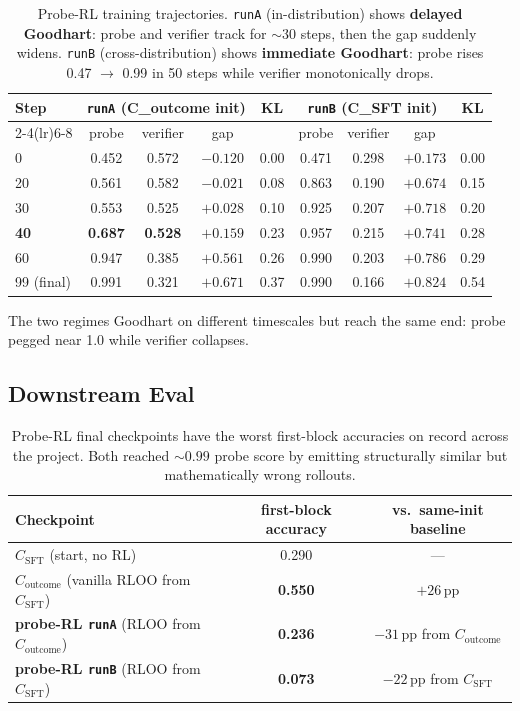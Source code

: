 \documentclass[11pt]{article}
\begin{document}
\begin{table}[h]
\centering
\small
\begin{tabular}{lcccccccc}
\toprule
Step & \multicolumn{3}{c}{\texttt{runA} (C\_outcome init)} & KL & \multicolumn{3}{c}{\texttt{runB} (C\_SFT init)} & KL \\
\cmidrule(lr){2-4}\cmidrule(lr){6-8}
& probe & verifier & gap & & probe & verifier & gap & \\
\midrule
0   & 0.452 & 0.572 & $-0.120$ & 0.00 & 0.471 & 0.298 & $+0.173$ & 0.00 \\
20  & 0.561 & 0.582 & $-0.021$ & 0.08 & 0.863 & 0.190 & $+0.674$ & 0.15 \\
30  & 0.553 & 0.525 & $+0.028$ & 0.10 & 0.925 & 0.207 & $+0.718$ & 0.20 \\
\textbf{40}  & \textbf{0.687} & \textbf{0.528} & \textbf{$+0.159$} & 0.23 & 0.957 & 0.215 & $+0.741$ & 0.28 \\
60  & 0.947 & 0.385 & $+0.561$ & 0.26 & 0.990 & 0.203 & $+0.786$ & 0.29 \\
99 (final) & 0.991 & 0.321 & $+0.671$ & 0.37 & 0.990 & 0.166 & $+0.824$ & 0.54 \\
\bottomrule
\end{tabular}
\caption{Probe-RL training trajectories. \texttt{runA} (in-distribution) shows \textbf{delayed Goodhart}: probe and verifier track for $\sim$30 steps, then the gap suddenly widens. \texttt{runB} (cross-distribution) shows \textbf{immediate Goodhart}: probe rises 0.47 $\to$ 0.99 in 50 steps while verifier monotonically drops.}
\end{table}

The two regimes Goodhart on different timescales but reach the same end: probe pegged near 1.0 while verifier collapses.

\subsection{Downstream Eval}

\begin{table}[h]
\centering
\small
\begin{tabular}{lcc}
\toprule
Checkpoint & first-block accuracy & vs.\ same-init baseline \\
\midrule
$C_{\text{SFT}}$ (start, no RL) & 0.290 & --- \\
$C_{\text{outcome}}$ (vanilla RLOO from $C_{\text{SFT}}$) & \textbf{0.550} & $+26$\,pp \\
\midrule
\textbf{probe-RL \texttt{runA}} (RLOO from $C_{\text{outcome}}$) & \textbf{0.236} & $-31$\,pp from $C_{\text{outcome}}$ \\
\textbf{probe-RL \texttt{runB}} (RLOO from $C_{\text{SFT}}$) & \textbf{0.073} & $-22$\,pp from $C_{\text{SFT}}$ \\
\bottomrule
\end{tabular}
\caption{Probe-RL final checkpoints have the worst first-block accuracies on record across the project. Both reached $\sim 0.99$ probe score by emitting structurally similar but mathematically wrong rollouts.}
\end{table}
\end{document}
